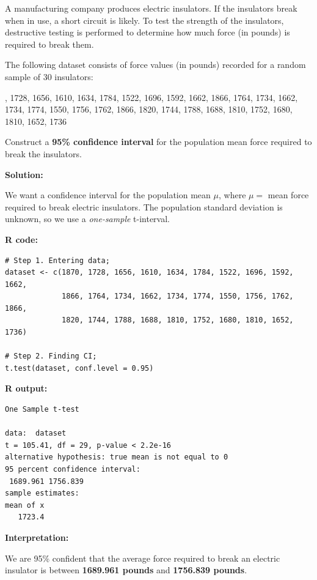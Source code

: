\begin{example}

A manufacturing company produces electric insulators. If the insulators break when in use, a short circuit is likely. To test the strength of the insulators, destructive testing is performed to determine how much force (in pounds) is required to break them.

The following dataset consists of force values (in pounds) recorded for a random sample of 30 insulators:

\begin{center}
\noindent{}, 1728, 1656, 1610, 1634, 1784, 1522, 1696, 1592, 1662, 1866, 1764, 1734, 1662, 1734, 1774, 1550, 1756, 1762, 1866, 1820, 1744, 1788, 1688, 1810, 1752, 1680, 1810, 1652, 1736
\end{center}

Construct a \textbf{95\% confidence interval} for the population mean force required to break the insulators.



 \textbf{Solution:}

We want a confidence interval for the population mean \(\mu\), where \(\mu =\) mean force required to break electric insulators. The population standard deviation is unknown, so we use a \textit{one-sample} t-interval.

\vspace{1em}
\noindent\textbf{R code:}

\begin{tcolorbox}[colback=gray!10, colframe=black!45, arc=2mm]



\begin{verbatim}
# Step 1. Entering data;
dataset <- c(1870, 1728, 1656, 1610, 1634, 1784, 1522, 1696, 1592, 1662,
             1866, 1764, 1734, 1662, 1734, 1774, 1550, 1756, 1762, 1866,
             1820, 1744, 1788, 1688, 1810, 1752, 1680, 1810, 1652, 1736)

# Step 2. Finding CI;
t.test(dataset, conf.level = 0.95)
\end{verbatim}
\end{tcolorbox}

\vspace{1em}
\noindent\textbf{R output:}

\begin{tcolorbox}[colback=gray!10, colframe=black!45, arc=2mm]



\begin{verbatim}
One Sample t-test

data:  dataset
t = 105.41, df = 29, p-value < 2.2e-16
alternative hypothesis: true mean is not equal to 0
95 percent confidence interval:
 1689.961 1756.839
sample estimates:
mean of x 
   1723.4 
\end{verbatim}
\end{tcolorbox}

\vspace{1em}
\textbf{Interpretation:}

We are 95\% confident that the average force required to break an electric insulator is between \textbf{1689.961 pounds} and \textbf{1756.839 pounds}.
\end{example}
